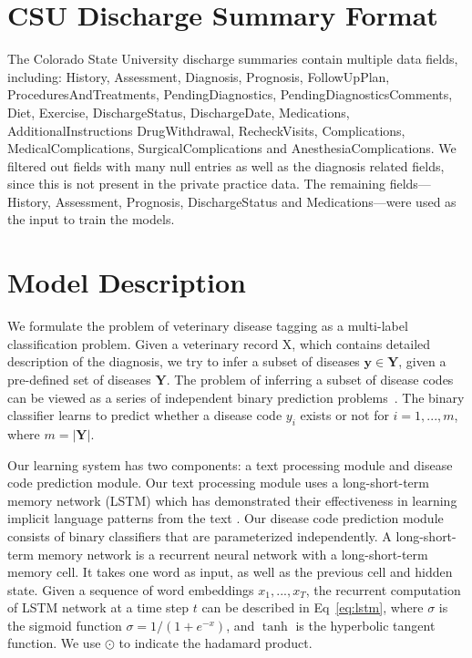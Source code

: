 \documentclass{article}[11pt,oneside]
\newcommand{\capital}[1]{\bm{\mathrm{#1}}}
\begin{document}
\clearpage

\maketitle

\tableofcontents

\section{CSU Discharge Summary Format}

The Colorado State University discharge summaries contain multiple data fields, including: History, Assessment, Diagnosis, Prognosis, FollowUpPlan, ProceduresAndTreatments, PendingDiagnostics, PendingDiagnosticsComments, Diet, Exercise, DischargeStatus, DischargeDate, Medications, AdditionalInstructions DrugWithdrawal, RecheckVisits, Complications, MedicalComplications, SurgicalComplications and AnesthesiaComplications. We filtered out fields with many null entries as well as the diagnosis related fields, since this is not present in the private practice data. The remaining fields---History, Assessment, Prognosis, DischargeStatus and Medications---were used as the input to train the models.

\section{Model Description}

We formulate the problem of veterinary disease tagging as a multi-label classification problem. Given a veterinary record $\capital{X}$, which contains detailed description of the diagnosis, we try to infer a subset of diseases $\bm{y} \in \mathcal{\bm{Y}}$, given a pre-defined set of diseases $\mathcal{\bm{Y}}$. The problem of inferring a subset of disease codes can be viewed as a series of independent binary prediction problems~\cite{sorower2010literature}. The binary classifier learns to predict whether a disease code $y_i$ exists or not for $i = 1,...,m$, where $m = |\mathcal{\bm{Y}}|$.

Our learning system has two components: a text processing module and disease code prediction module. Our text processing module uses a long-short-term memory network (LSTM) which has demonstrated their effectiveness in learning implicit language patterns from the text \cite{mikolov2012statistical}. Our disease code prediction module consists of binary classifiers that are parameterized independently. 
A long-short-term memory network is a recurrent neural network with a long-short-term memory cell. It takes one word as input, as well as the previous cell and hidden state. Given a sequence of word embeddings $x_1, ..., x_T$, the recurrent computation of LSTM network at a time step $t$ can be described in Eq~\ref{eq:lstm}, where $\sigma$ is the sigmoid function $\sigma = 1 / (1 + e^{-x})$, and $\tanh$ is the hyperbolic tangent function. We use $\odot$ to indicate the hadamard product.
\end{document}
